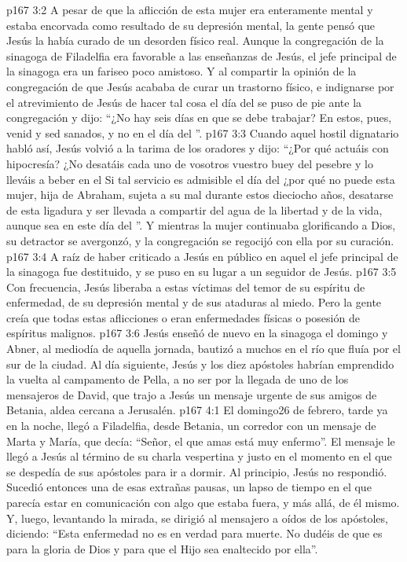 \vs p167 3:2 A pesar de que la aflicción de esta mujer era enteramente mental y estaba encorvada como resultado de su depresión mental, la gente pensó que Jesús la había curado de un desorden físico real. Aunque la congregación de la sinagoga de Filadelfia era favorable a las enseñanzas de Jesús, el jefe principal de la sinagoga era un fariseo poco amistoso. Y al compartir la opinión de la congregación de que Jesús acababa de curar un trastorno físico, e indignarse por el atrevimiento de Jesús de hacer tal cosa el día del  se puso de pie ante la congregación y dijo: “¿No hay seis días en que se debe trabajar? En estos, pues, venid y sed sanados, y no en el día del ”.
\vs p167 3:3 Cuando aquel hostil dignatario habló así, Jesús volvió a la tarima de los oradores y dijo: “¿Por qué actuáis con hipocresía? ¿No desatáis cada uno de vosotros vuestro buey del pesebre y lo lleváis a beber en el  Si tal servicio es admisible el día del  ¿por qué no puede esta mujer, hija de Abraham, sujeta a su mal durante estos dieciocho años, desatarse de esta ligadura y ser llevada a compartir del agua de la libertad y de la vida, aunque sea en este día del ”. Y mientras la mujer continuaba glorificando a Dios, su detractor se avergonzó, y la congregación se regocijó con ella por su curación.
\vs p167 3:4 A raíz de haber criticado a Jesús en público en aquel  el jefe principal de la sinagoga fue destituido, y se puso en su lugar a un seguidor de Jesús.
\vs p167 3:5 \pc Con frecuencia, Jesús liberaba a estas víctimas del temor de su espíritu de enfermedad, de su depresión mental y de sus ataduras al miedo. Pero la gente creía que todas estas aflicciones o eran enfermedades físicas o posesión de espíritus malignos.
\vs p167 3:6 \pc Jesús enseñó de nuevo en la sinagoga el domingo y Abner, al mediodía de aquella jornada, bautizó a muchos en el río que fluía por el sur de la ciudad. Al día siguiente, Jesús y los diez apóstoles habrían emprendido la vuelta al campamento de Pella, a no ser por la llegada de uno de los mensajeros de David, que trajo a Jesús un mensaje urgente de sus amigos de Betania, aldea cercana a Jerusalén.
\vs p167 4:1 El domingo26 de febrero, tarde ya en la noche, llegó a Filadelfia, desde Betania, un corredor con un mensaje de Marta y María, que decía: “Señor, el que amas está muy enfermo”. El mensaje le llegó a Jesús al término de su charla vespertina y justo en el momento en el que se despedía de sus apóstoles para ir a dormir. Al principio, Jesús no respondió. Sucedió entonces una de esas extrañas pausas, un lapso de tiempo en el que parecía estar en comunicación con algo que estaba fuera, y más allá, de él mismo. Y, luego, levantando la mirada, se dirigió al mensajero a oídos de los apóstoles, diciendo: “Esta enfermedad no es en verdad para muerte. No dudéis de que es para la gloria de Dios y para que el Hijo sea enaltecido por ella”.
